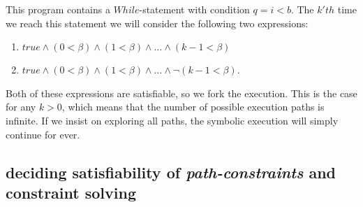 	This program contains a $While$-statement with condition $q = i < b$. The $k'th$ time we reach this statement we will consider the following two expressions:
	\begin{enumerate}
		\item $true \land (0 < \beta) \land (1 < \beta) \land \ldots \land (k-1 < \beta) $
		\item $true \land (0 < \beta) \land (1 < \beta) \land \ldots \land \neg (k-1 < \beta) $.
	\end{enumerate}
	Both of these expressions are satisfiable, so we fork the execution. This is the case for any $k > 0$, which means that the number of possible execution paths is infinite. If we insist on exploring all paths, the symbolic execution will simply continue for ever. 
	
	\subsection{deciding satisfiability of \emph{path-constraints} and constraint solving}
			
